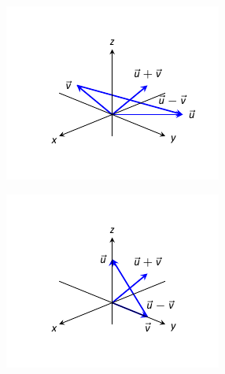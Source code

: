 \begin{Answer}
\Question
\begin{minipage}[m]{\linewidth}
\centering
\includegraphics[width=\linewidth/2]{vector_geometry/introduction_to_vectors/figures/fig10_02_ex_14ans}
\end{minipage}
\Question
\begin{minipage}[m]{\linewidth}
\centering
\includegraphics[width=\linewidth/2]{vector_geometry/introduction_to_vectors/figures/fig10_02_ex_15ans}
\end{minipage}
\end{Answer}
